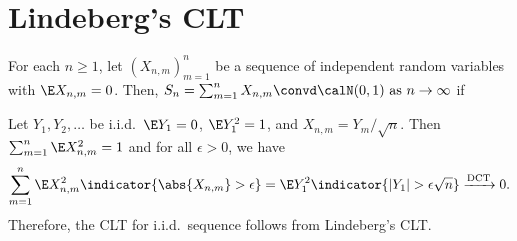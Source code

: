 \documentclass[../aipt.tex]{subfiles}
\begin{document}
\section{Lindeberg's CLT}
\begin{Theorem}
For each $n \geq 1$, let $\left(X_{n,m}\right)_{m=1}^n$ be a sequence of independent random variables with $\E X_{n,m} = 0$. Then, $S_n = \sum_{m=1}^n X_{n,m} \convd \calN (0,1) \ \text{as} \ n \to \infty$ if
\end{Theorem}

\begin{Remark}
Let $Y_1,Y_2,\ldots$ be i.i.d.\, $\E Y_1=0$, $\E Y_1^2=1$, and $X_{n,m}=Y_m/\sqrt{n}$. Then $\sum_{m=1}^n \E X_{n,m}^2=1$ and for all $\epsilon>0$, we have
\begin{align*}
\sum_{m=1}^n \E X_{n,m}^2 \indicator{\abs{X_{n,m}} > \epsilon}
= \E Y_1^2\indicator{|Y_1|>\epsilon\sqrt{n}} \xrightarrow{\text{DCT}} 0.
\end{align*}
Therefore, the CLT for i.i.d.\ sequence follows from Lindeberg's CLT.
\end{Remark}
\end{document}
